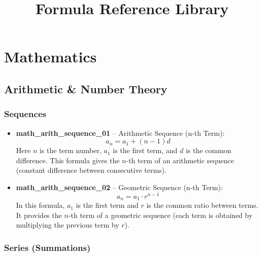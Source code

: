 \documentclass[11pt,a4paper]{article}
\begin{document}
\title{\textbf{Formula Reference Library}}
\author{}
\date{}
\maketitle

\tableofcontents
\newpage

\section{Mathematics}

\subsection{Arithmetic \& Number Theory}

\subsubsection{Sequences}

\begin{itemize}
\item \textbf{math\_arith\_sequence\_01} -- Arithmetic Sequence (n-th Term): 
\[a_n = a_1 + (n-1)d\]
Here $n$ is the term number, $a_1$ is the first term, and $d$ is the common difference. This formula gives the $n$-th term of an arithmetic sequence (constant difference between consecutive terms).

\item \textbf{math\_arith\_sequence\_02} -- Geometric Sequence (n-th Term): 
\[a_n = a_1 \cdot r^{n-1}\]
In this formula, $a_1$ is the first term and $r$ is the common ratio between terms. It provides the $n$-th term of a geometric sequence (each term is obtained by multiplying the previous term by $r$).
\end{itemize}

\subsubsection{Series (Summations)}
\end{document}
